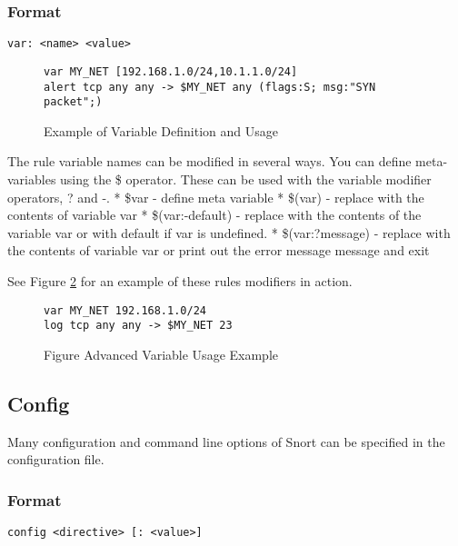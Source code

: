 \documentclass[english]{report}
\begin{document}
\subsubsection{Format}

\begin{verbatim}
var: <name> <value>
\end{verbatim}

\begin{figure}[!hbpt]
\begin{verbatim}
var MY_NET [192.168.1.0/24,10.1.1.0/24]
alert tcp any any -> $MY_NET any (flags:S; msg:"SYN packet";)
\end{verbatim}

\caption{Example of Variable Definition and Usage\label{variable definition}}
\end{figure}

The rule variable names can be modified in several ways. You can define
meta-variables using the \$ operator. These can be used with the variable
modifier operators, ?  and -. {*} \$var - define meta variable {*} \$(var) -
replace with the contents of variable var {*} \$(var:-default) - replace with
the contents of the variable var or with default if var is undefined. {*}
\$(var:?message) - replace with the contents of variable var or print out the
error message message and exit

See Figure \ref{advanced variable usage} for an example of these rules
modifiers in action.

\begin{figure}[!hbpt]
\begin{verbatim}
var MY_NET 192.168.1.0/24
log tcp any any -> $MY_NET 23
\end{verbatim}

\caption{Figure Advanced Variable Usage Example\label{advanced variable usage}}
\end{figure}

\subsection{Config}

Many configuration and command line options of Snort can be specified
in the configuration file. 

\subsubsection{Format}

\begin{center}
\begin{verbatim}
config <directive> [: <value>]
\end{verbatim}
\end{center}
\end{document}
